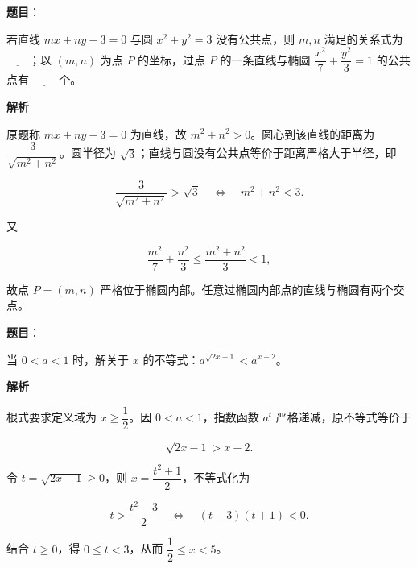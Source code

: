\begin{answer}

\textbf{题目}：

若直线 $mx+ny-3=0$ 与圆 $x^2+y^2=3$ 没有公共点，则 $m,n$ 满足的关系式为 $\underline{\qquad}$；以 $(m,n)$ 为点 $P$ 的坐标，过点 $P$ 的一条直线与椭圆 $\dfrac{x^2}{7}+\dfrac{y^2}{3}=1$ 的公共点有 $\underline{\qquad}$ 个。

\textbf{解析}

原题称 $mx+ny-3=0$ 为直线，故 $m^2+n^2>0$。圆心到该直线的距离为 $\dfrac3{\sqrt{m^2+n^2}}$。圆半径为 $\sqrt3$；直线与圆没有公共点等价于距离严格大于半径，即

\nopagebreak[4]
\[
\frac3{\sqrt{m^2+n^2}}>\sqrt3
\quad\Longleftrightarrow\quad
m^2+n^2<3.
\]

又

\nopagebreak[4]
\[
\frac{m^2}{7}+\frac{n^2}{3}
\le \frac{m^2+n^2}{3}<1,
\]

故点 $P=(m,n)$ 严格位于椭圆内部。任意过椭圆内部点的直线与椭圆有两个交点。


\end{answer}
\begin{answer}

\textbf{题目}：

当 $0<a<1$ 时，解关于 $x$ 的不等式：$a^{\sqrt{2x-1}}<a^{x-2}$。

\textbf{解析}

根式要求定义域为 $x\ge\dfrac12$。因 $0<a<1$，指数函数 $a^t$ 严格递减，原不等式等价于

\nopagebreak[4]
\[
\sqrt{2x-1}>x-2.
\]

令 $t=\sqrt{2x-1}\ge0$，则 $x=\dfrac{t^2+1}{2}$，不等式化为

\nopagebreak[4]
\[
t>\frac{t^2-3}{2}
\quad\Longleftrightarrow\quad
(t-3)(t+1)<0.
\]

结合 $t\ge0$，得 $0\le t<3$，从而 $\dfrac12\le x<5$。

\gkanswer{答案：$x\in[\dfrac12,5)$。}

\end{answer}
